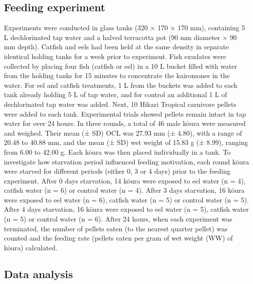 \documentclass[
  12pt,
  a4paper,
  oneside]{scrbook}
\begin{document}
\subsection{Feeding experiment}\label{feeding-experiment}

Experiments were conducted in glass tanks (320 × 170 × 170 mm),
containing 5 L dechlorinated tap water and a halved terracotta pot (90
mm diameter × 90 mm depth). Catfish and eels had been held at the same
density in separate identical holding tanks for a week prior to
experiment. Fish exudates were collected by placing four fish (catfish
or eel) in a 10 L bucket filled with water from the holding tanks for 15
minutes to concentrate the kairomones in the water. For eel and catfish
treatments, 1 L from the buckets was added to each tank already holding
5 L of tap water, and for control an additional 1 L of dechlorinated tap
water was added. Next, 10 Hikari Tropical carnivore pellets were added
to each tank. Experimental trials showed pellets remain intact in tap
water for over 24 hours. In three rounds, a total of 46 male kōura were
measured and weighed. Their mean (± SD) OCL was 27.93 mm (± 4.80), with
a range of 20.48 to 40.88 mm, and the mean (± SD) wet weight of 15.83 g
(± 8.99), ranging from 6.00 to 42.00 g. Each kōura was then placed
individually in a tank. To investigate how starvation period influenced
feeding motivation, each round kōura were starved for different periods
(either 0, 3 or 4 days) prior to the feeding experiment. After 0 days
starvation, 14 kōura were exposed to eel water (n = 4), catfish water (n
= 6) or control water (n = 4). After 3 days starvation, 16 kōura were
exposed to eel water (n = 6), catfish water (n = 5) or control water (n
= 5). After 4 days starvation, 16 kōura were exposed to eel water (n =
5), catfish water (n = 5) or control water (n = 6). After 24 hours, when
each experiment was terminated, the number of pellets eaten (to the
nearest quarter pellet) was counted and the feeding rate (pellets eaten
per gram of wet weight (WW) of kōura) calculated.

\subsection{Data analysis}\label{data-analysis}
\end{document}
